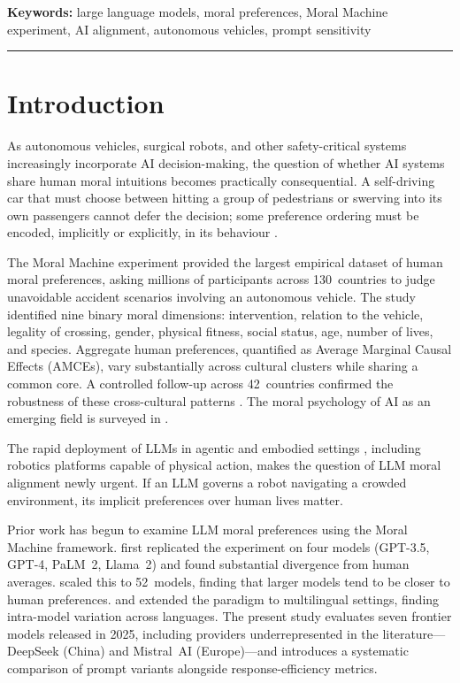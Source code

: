 \documentclass[11pt,letterpaper]{article}
\begin{document}
\noindent\textbf{Keywords:} large language models, moral preferences, Moral Machine
experiment, AI alignment, autonomous vehicles, prompt sensitivity

\hrule
\vspace{1em}

\section{Introduction}

As autonomous vehicles, surgical robots, and other safety-critical systems
increasingly incorporate AI decision-making, the question of whether AI systems
share human moral intuitions becomes practically consequential. A self-driving car
that must choose between hitting a group of pedestrians or swerving into its own
passengers cannot defer the decision; some preference ordering must be encoded,
implicitly or explicitly, in its behaviour \citep{bonnefon2016}.

The Moral Machine experiment \citep{awad2018} provided the largest empirical
dataset of human moral preferences, asking millions of participants across
130~countries to judge unavoidable accident scenarios involving an autonomous
vehicle. The study identified nine binary moral dimensions: intervention, relation
to the vehicle, legality of crossing, gender, physical fitness, social status,
age, number of lives, and species. Aggregate human preferences, quantified as
Average Marginal Causal Effects (AMCEs), vary substantially across cultural
clusters while sharing a common core. A controlled follow-up across 42~countries
confirmed the robustness of these cross-cultural patterns \citep{awad2020a}. The
moral psychology of AI as an emerging field is surveyed in \citet{bonnefon2024}.

The rapid deployment of LLMs in agentic and embodied settings
\citep{brohan2023,driess2023}, including robotics platforms capable of physical
action, makes the question of LLM moral alignment newly urgent. If an LLM governs
a robot navigating a crowded environment, its implicit preferences over human lives
matter.

Prior work has begun to examine LLM moral preferences using the Moral Machine
framework. \citet{takemoto2024} first replicated the experiment on four models
(GPT-3.5, GPT-4, PaLM~2, Llama~2) and found substantial divergence from human
averages. \citet{ahmad2025} scaled this to 52~models, finding that larger models
tend to be closer to human preferences. \citet{vida2024} and \citet{jin2024}
extended the paradigm to multilingual settings, finding intra-model variation
across languages. The present study evaluates seven frontier models released in
2025, including providers underrepresented in the literature---DeepSeek (China) and
Mistral~AI (Europe)---and introduces a systematic comparison of prompt variants
alongside response-efficiency metrics.
\end{document}
